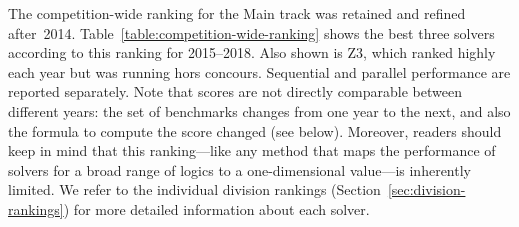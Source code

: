 \documentclass[dvipsnames,table,twoside,11pt]{article}
\begin{document}
The competition-wide ranking for the Main track was retained and
refined after~2014.  Table~\ref{table:competition-wide-ranking} shows
the best three solvers according to this ranking for 2015--2018.  Also
shown is Z3, which ranked highly each year but was running hors
concours.  Sequential and parallel performance are reported
separately.
%
Note that scores are not directly comparable between different years:
the set of benchmarks changes from one year to the next, and also the
formula to compute the score changed (see below).  Moreover, readers
should keep in mind that this ranking---like any method that maps the
performance of solvers for a broad range of logics to a
one-dimensional value---is inherently limited.  We refer to the
individual division rankings (Section~\ref{sec:division-rankings}) for
more detailed information about each solver.
\end{document}
